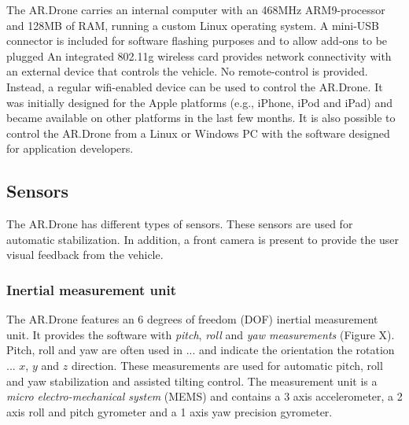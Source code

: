 The AR.Drone carries an internal computer with an 468MHz ARM9-processor and 128MB of RAM, running a custom Linux operating system.
A mini-USB connector is included for software flashing purposes and to allow add-ons to be plugged
An integrated 802.11g wireless card provides network connectivity with an external device that controls the vehicle.
No remote-control is provided. Instead, a regular wifi-enabled device can be used to control the AR.Drone.
It was initially designed for the Apple platforms (e.g., iPhone, iPod and iPad) and became available on other platforms in the last few months.
It is also possible to control the AR.Drone from a Linux or Windows PC with the software designed for application developers.



\subsection{Sensors}
The AR.Drone has different types of sensors.
These sensors are used for automatic stabilization.
In addition, a front camera is present to provide the user visual feedback from the vehicle.


\subsubsection{Inertial measurement unit}
The AR.Drone features an 6 degrees of freedom (DOF) inertial measurement unit.
It provides the software with \textit{pitch}, \textit{roll} and \textit{yaw measurements} (Figure X).
Pitch, roll and yaw are often used in ... and indicate the orientation the rotation ... $x$, $y$ and $z$ direction.
These measurements are used for automatic pitch, roll and yaw stabilization and assisted tilting control.
The measurement unit is a \textit{micro electro-mechanical system} (MEMS) and contains
a 3 axis accelerometer, a 2 axis roll and pitch gyrometer and a 1 axis yaw precision gyrometer.


